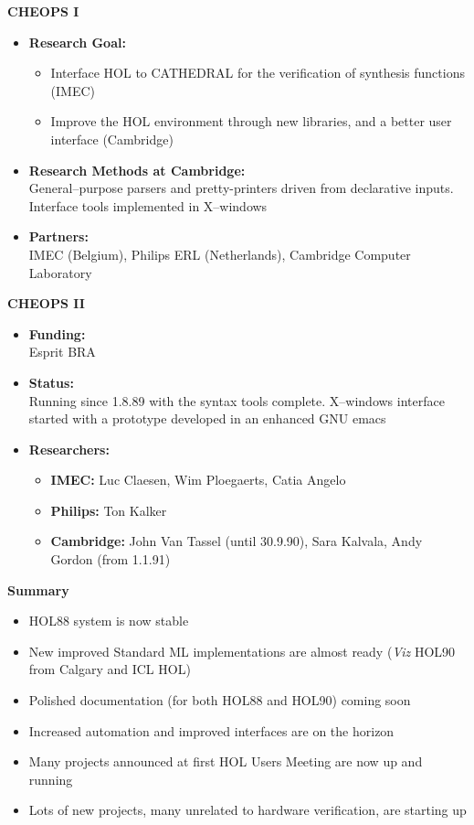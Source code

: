 \begin{center}{\bf CHEOPS I}\end{center}
\begin{itemize}
\item {\bf Research Goal:} 
\begin{itemize}
\item Interface {\small HOL} to {\small CATHEDRAL} for the verification
of synthesis functions ({\small IMEC})
\item Improve the {\small HOL} environment through new libraries, and a better
user interface (Cambridge)
\end{itemize}
\item {\bf Research Methods at Cambridge:} $\;$ \\
General--purpose parsers and pretty-printers driven from declarative inputs.
Interface tools implemented in X--windows
\item {\bf Partners:} $\;$\\
{\small IMEC} (Belgium), Philips {\small ERL} (Netherlands), Cambridge
Computer Laboratory
\end{itemize}

\begin{center}{\bf CHEOPS II}\end{center}
\begin{itemize}
\item {\bf Funding:}$\;$ \\
Esprit {\small BRA}
\item {\bf Status:}$\;$ \\
Running since 1.8.89 with the syntax tools complete.  X--windows interface
started with a prototype developed in an enhanced {\small GNU} emacs
\item {\bf Researchers:}
\begin{itemize}
\item {\small\bf IMEC}{\bf :} Luc Claesen, Wim Ploegaerts, Catia
Angelo
\item {\bf Philips:} Ton Kalker
\item {\bf Cambridge:} John Van Tassel (until 30.9.90),
Sara Kalvala, Andy Gordon (from 1.1.91)
\end{itemize}
\end{itemize}

\begin{center}{\bf Summary}\end{center}
\begin{itemize}
\item {\small HOL88} system is now stable
\item New improved Standard {\small ML} implementations are
almost ready ({\it Viz\/} {\small HOL90} from Calgary and {\small ICL HOL})
\item Polished documentation (for both {\small HOL88} 
and {\small HOL90}) coming soon
\item Increased automation and improved interfaces are on the horizon
\item Many projects announced at first HOL Users Meeting are now
up and running
\item Lots of new projects, many unrelated to hardware verification, are
starting up
\end{itemize}

